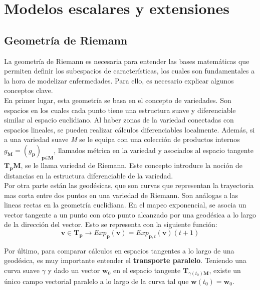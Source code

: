 	
	
	\section{Modelos escalares y extensiones}
	\subsection{Geometría de Riemann}
	La geometría de Riemann es necesaria para entender las bases matemáticas que permiten definir los subespacios de características, los cuales son fundamentales a la hora de modelizar enfermedades. Para ello, es necesario explicar algunos conceptos clave. \\
	
	En primer lugar, esta geometría se basa en el concepto de variedades. Son espacios en los cuales cada punto tiene una estructura suave y diferenciable similar al espacio euclidiano. Al haber zonas de la variedad conectadas con espacios lineales, se pueden realizar cálculos diferenciables localmente. Además, si a una variedad suave \textit{M} se le equipa con una colección de productos internos $g_{\textbf{M}}=(g_{\textbf{p}})_{\textbf{p}\in \textbf{M}}$, llamados métrica en la variedad y asociados al espacio tangente $\textbf{T}_{\textbf{p}}\textbf{M}$, se le llama variedad de Riemann. Este concepto introduce la noción de distancias en la estructura diferenciable de la variedad.\\
	
	Por otra parte están las geodésicas, que son curvas que representan la trayectoria mas corta entre dos puntos en una variedad de Riemann. Son análogas a las lineas rectas en la geometría euclidiana. En el mapeo exponencial, se asocia un vector tangente a un punto con otro punto alcanzado por una geodésica a lo largo de la dirección del vector. Esto se representa con la siguiente función:
	\begin{equation}
		\textbf{v}\in\textbf{T}_{\textbf{p}}\rightarrow Exp_{\textbf{p}}(\textbf{v})=Exp_{\textbf{p},t}(\textbf{v})(t+1)
	\end{equation} 
	
	Por último, para comparar cálculos en espacios tangentes a lo largo de una geodésica, es muy importante entender el \textbf{transporte paralelo}. Teniendo una curva suave $\gamma$ y dado un vector $\textbf{w}_{0}$ en el espacio tangente $\textbf{T}_{\gamma(t_{0})\textbf{M}}$, existe un único campo vectorial paralelo a lo largo de la curva tal que $\textbf{w}(t_{0})=\textbf{w}_{0}$.\cite[Capítulo 1]{koval2020learning}
	
